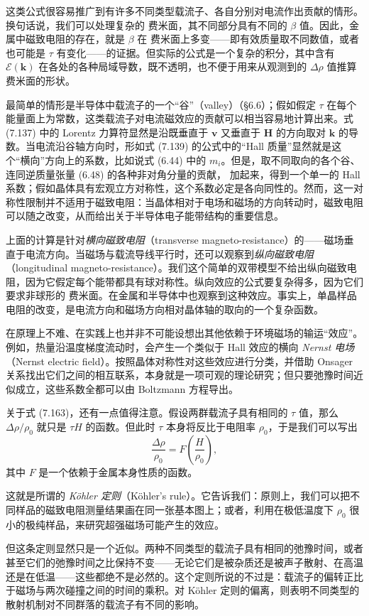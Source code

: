 这类公式很容易推广到有许多不同类型载流子、各自分别对电流作出贡献的情形。换句话说，我们可以处理复杂的 费米面，其不同部分具有不同的 $\beta$ 值。因此，金属中磁致电阻的存在，就是 $\beta$ 在 费米面上多变——即有效质量取不同数值，或者也可能是 $\tau$ 有变化——的证据。但实际的公式是一个复杂的积分，其中含有 $\mathcal{E}(\mathbf{k})$ 在各处的各种局域导数，既不透明，也不便于用来从观测到的 $\Delta\rho$ 值推算 费米面的形状。

最简单的情形是半导体中载流子的一个“谷”（valley）（§6.6）；假如假定 $\tau$ 在每个能量面上为常数，这类载流子对电流磁效应的贡献可以相当容易地计算出来。式 (7.137) 中的 Lorentz 力算符显然是沿既垂直于 $\mathbf{v}$ 又垂直于 $\mathbf{H}$ 的方向取对 $\mathbf{k}$ 的导数。当电流沿谷轴方向时，形如式 (7.139) 的公式中的“Hall 质量”显然就是这个“横向”方向上的系数，比如说式 (6.44) 中的 $m_{i}$。但是，取不同取向的各个谷、连同逆质量张量 (6.48) 的各种非对角分量的贡献，
加起来，得到一个单一的 Hall 系数；假如晶体具有宏观立方对称性，这个系数必定是各向同性的。然而，这一对称性限制并不适用于磁致电阻：当晶体相对于电场和磁场的方向转动时，磁致电阻可以随之改变，从而给出关于半导体电子能带结构的重要信息。

上面的计算是针对\emph{横向磁致电阻}（transverse magneto-resistance）的——磁场垂直于电流方向。当磁场与载流导线平行时，还可以观察到\emph{纵向磁致电阻}（longitudinal magneto-resistance）。我们这个简单的双带模型不给出纵向磁致电阻，因为它假定每个能带都具有球对称性。纵向效应的公式要复杂得多，因为它们要求非球形的 费米面。在金属和半导体中也观察到这种效应。事实上，单晶样品电阻的改变，是电流方向和磁场方向相对晶体轴的取向的一个复杂函数。

在原理上不难、在实践上也并非不可能设想出其他依赖于环境磁场的输运“效应”。例如，热量沿温度梯度流动时，会产生一个类似于 Hall 效应的横向 \emph{Nernst 电场}（Nernst electric field）。按照晶体对称性对这些效应进行分类，并借助 Onsager 关系找出它们之间的相互联系，本身就是一项可观的理论研究；但只要弛豫时间近似成立，这些系数全都可以由 Boltzmann 方程导出。

关于式 (7.163)，还有一点值得注意。假设两群载流子具有相同的 $\tau$ 值，那么 $\Delta\rho/\rho_{0}$ 就只是 $\tau H$ 的函数。但此时 $\tau$ 本身将反比于电阻率 $\rho_{0}$，于是我们可以写出
\begin{equation*}
\frac{\Delta\rho}{\rho_{0}}=F\left(\frac{H}{\rho_{0}}\right),\tag{7.164}
\end{equation*}
其中 $F$ 是一个依赖于金属本身性质的函数。

这就是所谓的 \emph{Köhler 定则}（Köhler's rule）。它告诉我们：原则上，我们可以把不同样品的磁致电阻测量结果画在同一张基本图上；或者，利用在极低温度下 $\rho_{0}$ 很小的极纯样品，来研究超强磁场可能产生的效应。

但这条定则显然只是一个近似。两种不同类型的载流子具有相同的弛豫时间，或者甚至它们的弛豫时间之比保持不变——无论它们是被杂质还是被声子散射、在高温还是在低温——这些都绝不是必然的。这个定则所说的不过是：载流子的偏转正比于磁场与两次碰撞之间的时间的乘积。对 Köhler 定则的偏离，则表明不同类型的散射机制对不同群落的载流子有不同的影响。
